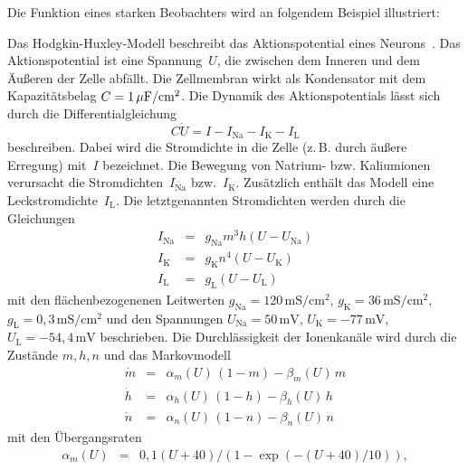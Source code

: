 Die Funktion eines starken Beobachters wird an folgendem Beispiel
illustriert:
\begin{example}
Das Hodgkin-Huxley-Modell beschreibt das Aktionspotential eines Neurons~\cite{hodgkin1952}.
Das Aktionspotential ist eine Spannung~$U$, die zwischen dem Inneren
und dem Äußeren der Zelle abfällt. Die Zellmembran wirkt als Kondensator
mit dem Kapazitätsbelag $C=1\,\text{\ensuremath{\mu}F}/\text{cm}^{2}$.
Die Dynamik des Aktionspotentials lässt sich durch die Differentialgleichung
\begin{equation}
C\dot{U}=I-I_{\text{Na}}-I_{\text{K}}-I_{\text{L}}\label{eq:uio-hodgkin1}
\end{equation}
beschreiben. Dabei wird die Stromdichte in die Zelle (z.\,B. durch
äußere Erregung) mit~$I$ bezeichnet. Die Bewegung von \hbox{Natrium-}
bzw. Kalium\-ionen verursacht die Stromdichten~$I_{\text{Na}}$
bzw.~$I_{\text{K}}$. Zusätzlich enthält das Modell eine Leckstromdichte~$I_{\text{L}}$.
Die letztgenannten Stromdichten werden durch die Gleichungen
\begin{equation}
\begin{array}{lcl}
I_{\text{Na}} & = & g_{\text{Na}}m^{3}h\left(U-U_{\text{Na}}\right)\\
I_{\text{K}} & = & g_{\text{K}}n^{4}\left(U-U_{\text{K}}\right)\\
I_{\text{L}} & = & g_{\text{L}}\left(U-U_{\text{L}}\right)
\end{array}\label{eq:uio-hodgkin2}
\end{equation}
mit den flächenbezogenenen Leitwerten $g_{\text{Na}}=120\,\text{mS}/\text{cm}^{2}$,
$g_{\text{K}}=36\,\text{mS}/\text{cm}^{2}$, $g_{\text{L}}=0,3\,\text{mS}/\text{cm}^{2}$
und den Spannungen $U_{\text{Na}}=50\,\text{mV}$, $U_{\text{K}}=-77\,\text{mV}$,
$U_{\text{L}}=-54,4\,\text{mV}$ beschrieben. Die Durchlässigkeit
der Ionenkanäle wird durch die Zustände $m,h,n$ und das Markovmodell
\begin{equation}
\begin{array}{ccl}
\dot{m} & = & \alpha_{m}(U)\,(1-m)-\beta_{m}(U)\,m\\
\dot{h} & = & \alpha_{h}(U)\,(1-h)-\beta_{h}(U)\,h\\
\dot{n} & = & \alpha_{n}(U)\,(1-n)-\beta_{n}(U)\,n
\end{array}\label{eq:uio-hoghkin3}
\end{equation}
mit den Übergangsraten 
\begin{equation}
\begin{array}{lcl}
\alpha_{m}(U) & = & 0,1(U+40)/(1-\exp(-(U+40)/10)),\\

\end{array}
\end{equation}
\end{example}
